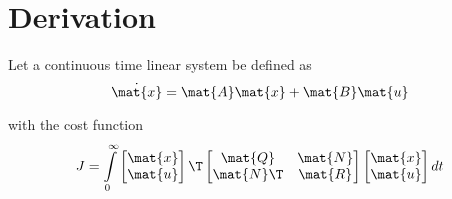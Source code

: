 \section{Derivation}

Let a continuous time linear \gls{system} be defined as
\begin{equation}
  \dot{\mat{x}} = \mat{A}\mat{x} + \mat{B}\mat{u}
\end{equation}

with the cost function
\begin{equation*}
  J = \int\limits_0^\infty
    \begin{bmatrix}
      \mat{x} \\
      \mat{u}
    \end{bmatrix}\T
    \begin{bmatrix}
      \mat{Q} & \mat{N} \\
      \mat{N}\T & \mat{R}
    \end{bmatrix}
    \begin{bmatrix}
      \mat{x} \\
      \mat{u}
    \end{bmatrix} dt
\end{equation*}

